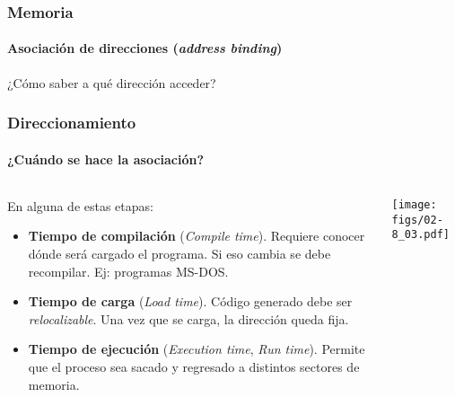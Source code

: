 \documentclass[letter]{beamer}
\begin{document}
\begin{frame}
  \frametitle{Memoria}
  \framesubtitle{Asociación de direcciones ({\em address binding})}

  ¿Cómo saber a qué dirección acceder?
  
  
  
  
  
\end{frame}
\begin{frame}
  \frametitle{Direccionamiento}
  \framesubtitle{¿Cuándo se hace la asociación?}

  \begin{columns}[c]
    \begin{column}[T]{8cm}
      En alguna de estas etapas:
      \begin{itemize}
        \item {\bf Tiempo de compilación} ({\em Compile time}).
              Requiere conocer dónde será cargado el programa. Si eso cambia se debe recompilar.
              Ej: programas MS-DOS.
        \item {\bf Tiempo de carga} ({\em Load time}).
              Código generado debe ser {\em relocalizable}. Una vez que se carga, la dirección queda fija.
        \item {\bf Tiempo de ejecución} ({\em Execution time}, {\em Run time}).
              Permite que el proceso sea sacado y regresado a distintos sectores de memoria.
      \end{itemize}
    \end{column}
    
    \begin{column}[T]{3.5cm}
      \begin{center}
        \texttt{[image: figs/02-8\_03.pdf]}
      \end{center}
    \end{column}
  \end{columns}


\end{frame}
\end{document}
